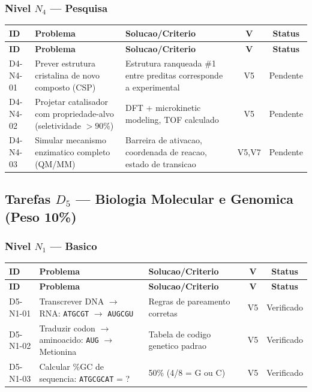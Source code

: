 \subsubsection{Nivel $N_4$ --- Pesquisa}

\begin{longtable}{|p{2.0cm}|p{4.2cm}|p{4.2cm}|c|c|}
\hline
\textbf{ID} & \textbf{Problema} & \textbf{Solucao/Criterio} & \textbf{V} & \textbf{Status} \\
\hline
\endfirsthead
\hline
\textbf{ID} & \textbf{Problema} & \textbf{Solucao/Criterio} & \textbf{V} & \textbf{Status} \\
\hline
\endhead
\hline
\endfoot
D4-N4-01 & Prever estrutura cristalina de novo composto (CSP) & Estrutura ranqueada \#1 entre preditas corresponde a experimental & V5 & Pendente \\
\hline
D4-N4-02 & Projetar catalisador com propriedade-alvo (seletividade $>90\%$) & DFT + microkinetic modeling, TOF calculado & V5 & Pendente \\
\hline
D4-N4-03 & Simular mecanismo enzimatico completo (QM/MM) & Barreira de ativacao, coordenada de reacao, estado de transicao & V5,V7 & Pendente \\
\hline
\end{longtable}

\subsection{Tarefas $D_5$ --- Biologia Molecular e Genomica (Peso 10\%)}

\subsubsection{Nivel $N_1$ --- Basico}

\begin{longtable}{|p{2.0cm}|p{4.2cm}|p{4.2cm}|c|c|}
\hline
\textbf{ID} & \textbf{Problema} & \textbf{Solucao/Criterio} & \textbf{V} & \textbf{Status} \\
\hline
\endfirsthead
\hline
\textbf{ID} & \textbf{Problema} & \textbf{Solucao/Criterio} & \textbf{V} & \textbf{Status} \\
\hline
\endhead
\hline
\endfoot
D5-N1-01 & Transcrever DNA $\rightarrow$ RNA: \texttt{ATGCGT} $\rightarrow$ \texttt{AUGCGU} & Regras de pareamento corretas & V5 & Verificado \\
\hline
D5-N1-02 & Traduzir codon $\rightarrow$ aminoacido: \texttt{AUG} $\rightarrow$ Metionina & Tabela de codigo genetico padrao & V5 & Verificado \\
\hline
D5-N1-03 & Calcular \%GC de sequencia: \texttt{ATGCGCAT} = ? & 50\% (4/8 = G ou C) & V5 & Verificado \\
\hline
\end{longtable}


